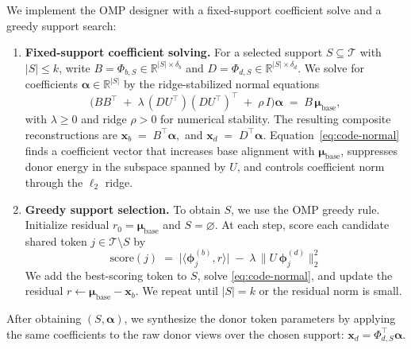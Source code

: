 \documentclass{article}
\theoremstyle{plain}
\theoremstyle{definition}
\theoremstyle{remark}
\begin{document}
We implement the OMP designer with a fixed-support coefficient solve and a greedy support search:


\begin{enumerate}[leftmargin=*,topsep=0pt,itemsep=0pt,parsep=0pt,partopsep=0pt]
    \item \textbf{Fixed-support coefficient solving.}
For a selected support $S\subseteq\mathcal{T}$ with $|S|\le k$, write $B=\Phi_{b,S}\in\mathbb{R}^{|S|\times \delta_b}$ and $D=\Phi_{d,S}\in\mathbb{R}^{|S|\times \delta_d}$. We solve for coefficients $\boldsymbol{\alpha}\in\mathbb{R}^{|S|}$ by the ridge-stabilized normal equations
\begin{equation}
\label{eq:code-normal}
\Big(BB^\top \;+\; \lambda\,(DU^\top)(DU^\top)^\top \;+\; \rho\,I\Big)\boldsymbol{\alpha}
\;=\;
B\,\boldsymbol{\mu}_{\text{base}},
\end{equation}
with $\lambda\ge 0$ and ridge $\rho>0$ for numerical stability.
The resulting composite reconstructions are
$
\mathbf{x}_b \;=\; B^\top\boldsymbol{\alpha},$ and $ \mathbf{x}_d \;=\; D^\top\boldsymbol{\alpha}.
$
Equation~\eqref{eq:code-normal} finds a coefficient vector that increases base alignment with $\boldsymbol{\mu}_{\text{base}}$, suppresses donor energy in the subspace spanned by $U$, and controls coefficient norm through the $\ell_2$ ridge.

\item  \textbf{Greedy support selection.}
To obtain $S$, we use the OMP greedy rule. Initialize residual $r_0=\boldsymbol{\mu}_{\text{base}}$ and $S=\varnothing$. At each step, score each candidate shared token $j\in\mathcal{T}\setminus S$ by
\begin{equation}
\label{eq:code-score}
\mathrm{score}(j)
\;=\;
\big|\langle \boldsymbol{\phi}^{(b)}_j, r\rangle\big|
\;-\;
\lambda\,\|U\,\boldsymbol{\phi}^{(d)}_j\|_2^2
\end{equation}
We add the best-scoring token to $S$, solve \eqref{eq:code-normal}, and update the residual $r\leftarrow \boldsymbol{\mu}_{\text{base}}-\mathbf{x}_b$. We repeat until $|S|=k$ or the residual norm is small.
\end{enumerate}
After obtaining $(S,\boldsymbol{\alpha})$, we synthesize the donor token parameters by applying the same coefficients to the raw donor views over the chosen support: $\mathbf{x}_d=\Phi_{d,S}^\top\boldsymbol{\alpha}$.

\vspace{-2mm}
\end{document}
